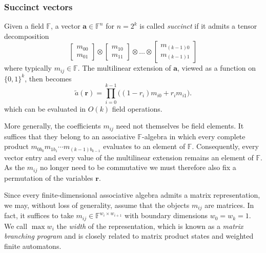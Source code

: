 
\subsubsection{Succinct vectors}

Given a field $\mathbb{F}$, a vector $\mathbf{a} \in \mathbb{F}^n$ for $n = 2^k$ is called \emph{succinct} if it admits a tensor decomposition
\begin{equation}
\begin{bmatrix}
m_{00} \\ m_{01}
\end{bmatrix}
\otimes
\begin{bmatrix}
m_{10} \\ m_{11}
\end{bmatrix}
\otimes \dots \otimes
\begin{bmatrix}
m_{(k-1)0} \\ m_{(k-1)1}
\end{bmatrix}
\end{equation}
where typically $m_{ij} \in \mathbb{F}$. The multilinear extension of $\mathbf{a}$, viewed as a function on $\{0,1\}^k$, then becomes
\begin{equation}
\widetilde{a}(\mathbf{r}) = \prod_{i=0}^{k-1} \bigl( (1 - r_i) m_{i0} + r_i m_{i1} \bigr) \text{.}
\end{equation}
which can be evaluated in $O(k)$ field operations.

More generally, the coefficients $m_{ij}$ need not themselves be field elements. It suffices that they belong to an associative $\mathbb{F}$-algebra in which every complete product $m_{0b_0}m_{1b_1}\cdots m_{(k-1)b_{k-1}}$ evaluates to an element of $\mathbb{F}$. Consequently, every vector entry and every value of the multilinear extension remains an element of $\mathbb{F}$. As the $m_{ij}$ no longer need to be commutative we must therefore also fix a permutation of the variables $\mathbf{r}$.

Since every finite-dimensional associative algebra admits a matrix representation, we may, without loss of generality, assume that the objects $m_{ij}$ are matrices. In fact, it suffices to take $m_{ij}\in\mathbb{F}^{w_i\times w_{i+1}}$ with boundary dimensions $w_0=w_k=1$. We call $\max w_i$ the \emph{width} of the representation, which is known as a \emph{matrix branching program} and is closely related to matrix product states and weighted finite automatons.

